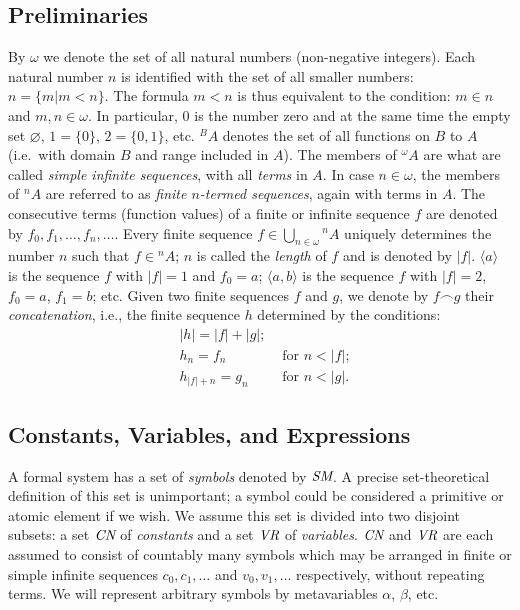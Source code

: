 \subsection[Preliminaries]{Preliminaries\protect\footnotemark}%

By $\omega$ we denote the set of all natural numbers (non-negative integers).
Each natural number $n$ is identified with the set of all smaller numbers: $n =
\{ m | m < n \}$.  The formula $m < n$ is thus equivalent to the condition: $m
\in n$ and $m,n \in \omega$. In particular, 0 is the number zero and at the
same time the empty set $\varnothing$, $1=\{0\}$, $2=\{0,1\}$, etc. ${}^B A$
denotes the set of all functions on $B$ to $A$ (i.e.\ with domain $B$ and range
included in $A$).  The members of ${}^\omega A$ are what are called {\em simple
infinite sequences},
with all {\em terms} in $A$.  In case $n \in \omega$, the
members of ${}^n A$ are referred to as {\em finite $n$-termed
sequences}, again
with terms in $A$.  The consecutive terms (function values) of a finite or
infinite sequence $f$ are denoted by $f_0, f_1, \ldots ,f_n,\ldots$.  Every
finite sequence $f \in \bigcup _{n \in \omega} {}^n A$ uniquely determines the
number $n$ such that $f \in {}^n A$; $n$ is called the {\em
length} of $f$ and
is denoted by $|f|$.  $\langle a \rangle$ is the sequence $f$ with $|f|=1$ and
$f_0=a$; $\langle a,b \rangle$ is the sequence $f$ with $|f|=2$, $f_0=a$,
$f_1=b$; etc.  Given two finite sequences $f$ and $g$, we denote by $f\frown g$
their {\em concatenation}, i.e., the
finite sequence $h$ determined by the
conditions:
\begin{eqnarray*}
& |h| = |f|+|g|;&  \\
& h_n = f_n & \mbox{\ for\ } n < |f|;  \\
& h_{|f|+n} = g_n & \mbox{\ for\ } n < |g|.
\end{eqnarray*}

\subsection{Constants, Variables, and Expressions}

A formal system has a set of {\em symbols} denoted
by $\mbox{\em SM}$.  A
precise set-theo\-ret\-i\-cal definition of this set is unimportant; a symbol
could be considered a primitive or atomic element if we wish.  We assume this
set is divided into two disjoint subsets:  a set $\mbox{\em CN}$ of {\em
constants} and a set $\mbox{\em VR}$ of
{\em variables}.  $\mbox{\em CN}$ and
$\mbox{\em VR}$ are each assumed to consist of countably many symbols which
may be arranged in finite or simple infinite sequences $c_0, c_1, \ldots$ and
$v_0, v_1, \ldots$ respectively, without repeating terms.  We will represent
arbitrary symbols by metavariables $\alpha$, $\beta$, etc.

